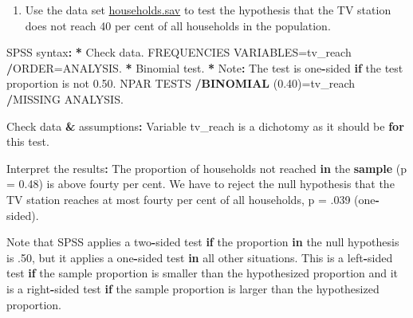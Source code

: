\documentclass[a4paper]{book}
\newenvironment{Shaded}{\begin{snugshade}}{\end{snugshade}}
\newcommand{\KeywordTok}[1]{\textcolor[rgb]{0,0,0}{\textbf{#1}}}
\newcommand{\DataTypeTok}[1]{\textcolor[rgb]{0,0,0}{#1}}
\newcommand{\DecValTok}[1]{\textcolor[rgb]{0.00,0.00,0.00}{#1}}
\newcommand{\FloatTok}[1]{\textcolor[rgb]{0.00,0.00,0.00}{#1}}
\newcommand{\StringTok}[1]{\textcolor[rgb]{0.00,0.00,0.00}{#1}}
\newcommand{\ControlFlowTok}[1]{\textcolor[rgb]{0.00,0.00,0.00}{\textbf{#1}}}
\newcommand{\OperatorTok}[1]{\textcolor[rgb]{0.00,0.00,0.00}{\textbf{#1}}}
\newcommand{\ErrorTok}[1]{\textcolor[rgb]{0.00,0.00,0.00}{\textbf{#1}}}
\newcommand{\NormalTok}[1]{#1}
\providecommand{\tightlist}{%
  \setlength{\itemsep}{0pt}\setlength{\parskip}{0pt}}
\theoremstyle{definition}
\theoremstyle{definition}
\theoremstyle{definition}
\theoremstyle{remark}
\begin{document}
\begin{enumerate}
\def\labelenumi{\arabic{enumi}.}
\tightlist
\item
  Use the data set
  \href{http://82.196.4.233:3838/data/households.sav}{households.sav} to
  test the hypothesis that the TV station does not reach 40 per cent of
  all households in the population.
\end{enumerate}

\begin{Shaded}
\begin{Highlighting}[]
\NormalTok{SPSS syntax}\OperatorTok{:}\StringTok{  }
\StringTok{  }
\ErrorTok{*}\StringTok{ }\NormalTok{Check data.  }
\NormalTok{FREQUENCIES VARIABLES=tv_reach  }
  \OperatorTok{/}\NormalTok{ORDER=ANALYSIS.  }
\OperatorTok{*}\StringTok{ }\NormalTok{Binomial test.  }
\OperatorTok{*}\StringTok{ }\NormalTok{Note}\OperatorTok{:}\StringTok{ }\NormalTok{The test is one}\OperatorTok{-}\NormalTok{sided }\ControlFlowTok{if}\NormalTok{ the test proportion is not }\FloatTok{0.50}\NormalTok{.  }
\NormalTok{NPAR TESTS  }
  \OperatorTok{/}\KeywordTok{BINOMIAL}\NormalTok{ (}\FloatTok{0.40}\NormalTok{)=tv_reach  }
  \OperatorTok{/}\NormalTok{MISSING ANALYSIS.  }
  
\NormalTok{Check data }\OperatorTok{&}\StringTok{ }\NormalTok{assumptions}\OperatorTok{:}\StringTok{   }
\StringTok{  }
\NormalTok{Variable tv_reach is a dichotomy as it should be }\ControlFlowTok{for}\NormalTok{ this test.  }
    
\NormalTok{Interpret the results}\OperatorTok{:}\StringTok{  }
\StringTok{  }
\NormalTok{The proportion of households not reached }\ControlFlowTok{in}\NormalTok{ the }\KeywordTok{sample}\NormalTok{ (}\DataTypeTok{p =} \FloatTok{0.48}\NormalTok{) is above}
\NormalTok{fourty per cent. We have to reject the null hypothesis that the TV station}
\NormalTok{reaches at most fourty per cent of all households, p =}\StringTok{ }\NormalTok{.}\DecValTok{039}\NormalTok{ (one}\OperatorTok{-}\NormalTok{sided).}

\NormalTok{Note that SPSS applies a two}\OperatorTok{-}\NormalTok{sided test }\ControlFlowTok{if}\NormalTok{ the proportion }\ControlFlowTok{in}\NormalTok{ the null}
\NormalTok{hypothesis is .}\DecValTok{50}\NormalTok{, but it applies a one}\OperatorTok{-}\NormalTok{sided test }\ControlFlowTok{in}\NormalTok{ all other situations.}
\NormalTok{This is a left}\OperatorTok{-}\NormalTok{sided test }\ControlFlowTok{if}\NormalTok{ the sample proportion is smaller than the}
\NormalTok{hypothesized proportion and it is a right}\OperatorTok{-}\NormalTok{sided test }\ControlFlowTok{if}\NormalTok{ the sample proportion}
\NormalTok{is larger than the hypothesized proportion.}


\end{Highlighting}
\end{Shaded}
\end{document}
